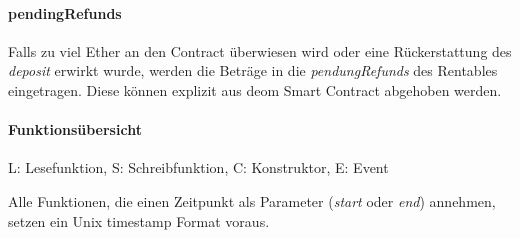\paragraph{pendingRefunds}
Falls zu viel Ether an den Contract überwiesen wird oder eine Rückerstattung des \emph{deposit} erwirkt wurde, werden die Beträge in die \emph{pendungRefunds} des Rentables eingetragen. Diese können explizit aus deom Smart Contract abgehoben werden.\cite[Miscellaneous/Introduction to Smart Contracts]{solidity.readthedocs.io}

\paragraph{Funktionsübersicht}

L: Lesefunktion, S: Schreibfunktion, C: Konstruktor, E: Event

Alle Funktionen, die einen Zeitpunkt als Parameter (\emph{start} oder \emph{end}) annehmen, setzen ein Unix timestamp Format voraus.

